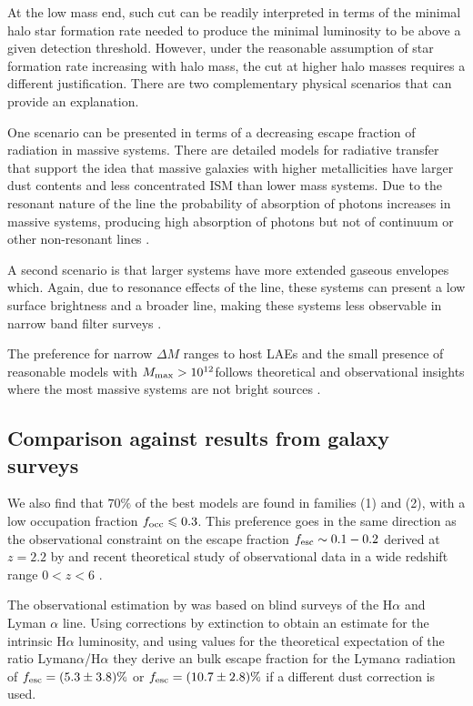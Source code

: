 \documentclass[usenatbib]{mn2e}
\newcommand{\ly}{{\ifmmode{{\rm Ly}\alpha}\else{Ly$\alpha$~}\fi}}
\newcommand{\hMsun}{{\ifmmode{h^{-1}{\rm
        {M_{\odot}}}}\else{$h^{-1}{\rm{M_{\odot}}}$}\fi}}
\begin{document}
At the low mass end, such cut can be readily interpreted in terms of the
minimal halo star formation rate needed to produce the minimal \ly 
luminosity to be above a given detection threshold.  However, under
the reasonable assumption of star formation rate increasing with halo
mass, the cut at higher halo masses requires a different
justification. There are two complementary physical scenarios that can
provide an explanation.

One scenario can be presented in terms of a decreasing escape
fraction of \ly radiation in massive systems. There are detailed models for
radiative transfer that support the idea that massive galaxies with
higher metallicities have larger dust contents and less concentrated
ISM than lower mass systems. Due to the resonant nature of the
\ly line the probability of absorption  of \ly photons increases in
massive systems, producing high absorption of \ly photons but not of
continuum or other non-resonant lines
\citep{Laursen2009,ForeroRomero2011}. 

A second scenario is that larger systems have more extended gaseous
envelopes which. Again, due to resonance effects of the \ly line,
these systems can present a low surface brightness and a broader line,
making these systems less observable in narrow band filter surveys
\citep{Laursen2009,Zheng2010}.  

The preference for narrow $\Delta M$ ranges to host LAEs 
and the small presence of reasonable models with $M_{\rm max}>
10^{12}$\hMsun follows theoretical and observational
insights where the most massive systems are not bright \ly sources
\citep{ForeroRomero2012,Shapley2003}. 

\subsection{Comparison against results from galaxy surveys}

We also find that $70\%$ of the best models are found in families (1)
and (2), with a low occupation fraction $f_{\rm occ}\leq 0.3$. This
preference goes in the same direction as the observational constraint
on the escape fraction $f_{\rm esc}\sim 0.1-0.2$ derived at $z=2.2$ by
\cite{Hayes2010} and recent theoretical study of observational data in
a wide redshift range $0<z<6$  \citep{Dijkstra2013}. 

The observational estimation by \cite{Hayes2010} was based on blind
surveys of the H$\alpha$ and Lyman $\alpha$ line. Using corrections by
extinction to obtain an estimate for the intrinsic H$\alpha$
luminosity, and using values for the theoretical expectation of the
ratio Lyman$\alpha$/H$\alpha$ they derive an bulk escape fraction for
the Lyman$\alpha$ radiation of $f_{\rm esc}=(5.3\pm 3.8)\%$ or $f_{\rm
  esc}=(10.7\pm 2.8)\%$ if a different dust correction is used. 
\end{document}
